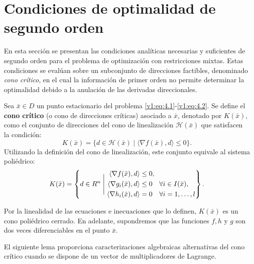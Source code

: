 
\section{Condiciones de optimalidad de segundo orden}

En esta sección se presentan las condiciones analíticas necesarias y suficientes de segundo orden para el problema de optimización con restricciones mixtas. Estas condiciones se evalúan sobre un subconjunto de direcciones factibles, denominado \textit{cono crítico}, en el cual la información de primer orden no permite determinar la optimalidad debido a la anulación de las derivadas direccionales.

\begin{definition}\label{v1:def:cono_critico}
 Sea $\bar{x} \in D$ un punto estacionario del problema \eqref{v1:eq:4.1}-\eqref{v1:eq:4.2}. Se define el \textbf{cono crítico} (o cono de direcciones críticas) asociado a $\bar{x}$, denotado por $K(\bar{x})$, como el conjunto de direcciones del cono de linealización $\mathcal{H}(\bar{x})$ que satisfacen la condición:
 \begin{equation}
 K(\bar{x}) = \{ d \in \mathcal{H}(\bar{x}) \mid \langle \nabla f(\bar{x}), d \rangle \le 0 \}.
 \label{v1:eq:cono_critico_def}
 \end{equation}
 Utilizando la definición del cono de linealización, este conjunto equivale al sistema poliédrico:
 \[
 K(\bar{x}) = \left\{ d \in R^n \mathrel{\Bigg|} \begin{aligned}
 \langle \nabla f(\bar{x}), d \rangle &\le 0, \\
 \langle \nabla g_i(\bar{x}), d \rangle &\le 0 \quad \forall i \in I(\bar{x}), \\
 \langle \nabla h_i(\bar{x}), d \rangle &= 0 \quad \forall i = 1, \dots, l
 \end{aligned} \right\}.
 \]
\end{definition}

\begin{remark}
 Por la linealidad de las ecuaciones e inecuaciones que lo definen, $K(\bar{x})$ es un cono poliédrico cerrado. En adelante, supondremos que las funciones $f, h$ y $g$ son dos veces diferenciables en el punto $\bar{x}$.
\end{remark}

El siguiente lema proporciona caracterizaciones algebraicas alternativas del cono crítico cuando se dispone de un vector de multiplicadores de Lagrange.

